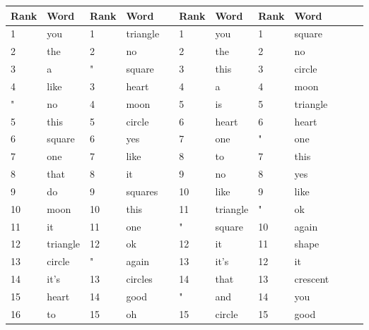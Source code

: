 \begin{screenonly}
\begin{table*}[h]
\begin{center}
\begin{tabular*}{\hsize}{@{\extracolsep{\fill}}llllllllllll}
      Rank & Word & Rank & Word & \hspace*{5ex} & Rank & Word & Rank & Word\\
      \midrule
      1 & you & 1 & triangle & \hspace*{5ex} & 1 & you & 1 & square\\
      2 & the & 2 & no & \hspace*{5ex} & 2 & the & 2 & no\\
      3 & a & " & square & \hspace*{5ex}& 3 & this & 3 & circle\\
      4 & like & 3 & heart & \hspace*{5ex} &4 & a & 4 & moon\\
      " & no & 4 & moon & \hspace*{5ex} & 5 & is & 5 & triangle\\
      5 & this & 5 & circle & \hspace*{5ex} & 6 & heart & 6 & heart\\
      6 & square & 6 & yes & \hspace*{5ex} & 7 & one & " & one\\
      7 & one & 7 & like & \hspace*{5ex} & 8 & to & 7 & this\\
      8 & that & 8 & it & \hspace*{5ex} & 9 & no & 8 & yes\\
      9 & do & 9 & squares & \hspace*{5ex} & 10 & like & 9 & like\\
      10 & moon & 10 & this & \hspace*{5ex} & 11 & triangle & " & ok\\
      11 & it & 11 & one & \hspace*{5ex} & " & square & 10 & again\\
      12 & triangle & 12 & ok & \hspace*{5ex} & 12 & it & 11 & shape\\
      13 & circle & " & again & \hspace*{5ex} & 13 & it's & 12 & it\\
      14 & it's & 13 & circles & \hspace*{5ex} & 14 & that & 13 & crescent\\
      15 & heart & 14 & good & \hspace*{5ex} & " & and & 14 & you\\
      16 & to & 15 & oh & \hspace*{5ex} & 15 & circle & 15 & good\\

\end{tabular*}
\end{center}
\end{table*}
\end{screenonly}
